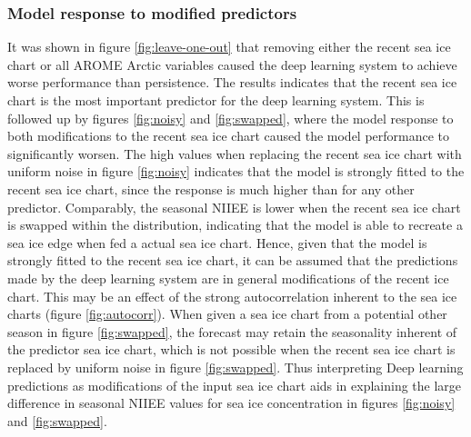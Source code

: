 \documentclass[../main/thesis]{subfiles}
\begin{document}
\subsubsection{Model response to modified predictors}
\label{sec:discuss_model_response}
It was shown in figure \ref{fig:leave-one-out} that removing either the recent sea ice chart or all AROME Arctic variables caused the deep learning system to achieve worse performance than persistence. The results indicates that the recent sea ice chart is the most important predictor for the deep learning system. This is followed up by figures \ref{fig:noisy} and \ref{fig:swapped}, where the model response to both modifications to the recent sea ice chart caused the model performance to significantly worsen. The high values when replacing the recent sea ice chart with uniform noise in figure \ref{fig:noisy} indicates that the model is strongly fitted to the recent sea ice chart, since the response is much higher than for any other predictor. Comparably, the seasonal NIIEE is lower when the recent sea ice chart is swapped within the distribution, indicating that the model is able to recreate a sea ice edge when fed a actual sea ice chart. Hence, given that the model is strongly fitted to the recent sea ice chart, it can be assumed that the predictions made by the deep learning system are in general modifications of the recent ice chart. This may be an effect of the strong autocorrelation inherent to the sea ice charts (figure \ref{fig:autocorr}). When given a sea ice chart from a potential other season in figure \ref{fig:swapped}, the forecast may retain the seasonality inherent of the predictor sea ice chart, which is not possible when the recent sea ice chart is replaced by uniform noise in figure \ref{fig:swapped}. Thus interpreting Deep learning predictions as modifications of the input sea ice chart aids in explaining the large difference in seasonal NIIEE values for sea ice concentration in figures \ref{fig:noisy} and \ref{fig:swapped}.
\end{document}
